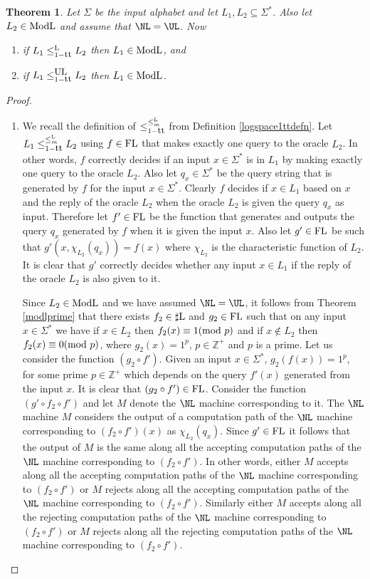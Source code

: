 \documentclass{amsbook}
\newtheorem{theorem}{Theorem}[chapter]
\theoremstyle{definition}
\theoremstyle{remark}
\numberwithin{section}{chapter}
\numberwithin{equation}{chapter}
\newcommand{\Lredn}{\leq^{\small{\rm L}}_m}
\newcommand{\ULredn}{\mbox{\small{\rm UL}}}
\newcommand{\sharpL}{\mbox{$\sharp$\rm L}}
\newcommand{\ModL}{\mbox{\rm ModL}}
\newcommand{\FL}{\mbox{\rm FL}}
\renewcommand{\mod}{\mbox{\textrm mod~}}
\newcommand{\Z}{\mathbb{Z}}
\newcommand{\trt}{\mbox{\small{\rm tt}}}
\begin{document}
\begin{theorem}\label{modlconclos}
Let $\Sigma$ be the input alphabet and let $L_1,L_2\subseteq \Sigma ^{*}$. Also let $L_2\in\ModL$ and assume that $\NL =\UL$. Now
\begin{enumerate}
\item \label{modl1trt} if $L_1\leq ^{\mathrm{L}}_{1-\trt}L_2$ then $L_1\in\ModL$, and 
\item \label{modlul1trt} if $L_1\leq^{\ULredn}_{1-\trt}L_2$ then $L_1\in\ModL$.
\end{enumerate}
\end{theorem}
\begin{proof}
\begin{enumerate}
\item We recall the definition of $\leq^{\Lredn}_{1-\trt}$ from Definition \ref{logspace1ttdefn}. Let $L_1\leq ^{\Lredn}_{1-\trt}L_2$ using $f\in\FL$ that makes exactly one query to the oracle $L_2$. In other words, $f$ correctly decides if an input $x\in\Sigma^{*}$ is in $L_1$ by making exactly one query to the oracle $L_2$. Also let  $q_x\in\Sigma ^{*}$ be the query string that is generated by $f$ for the input $x\in\Sigma ^{*}$. Clearly $f$ decides if $x\in L_1$ based on $x$ and the reply of the oracle $L_2$ when the oracle $L_2$ is given the query $q_x$ as input. Therefore let $f'\in\FL$ be the function that generates and outputs the query $q_x$ generated by $f$ when it is given the input $x$. Also let $g'\in\FL$ be such that $g'(x,\chi _{L_2}(q_x))=f(x)$ where $\chi _{L_2}$ is the characteristic function of $L_2$. It is clear that $g'$ correctly decides whether any input $x\in L_1$ if the reply of the oracle $L_2$ is also given to it.

Since $L_2\in\ModL$ and we have assumed $\NL =\UL$, it follows from Theorem \ref{modlprime} that there exists $f_2\in\sharpL$ and $g_2\in\FL$ such that on any input $x\in\Sigma^{*}$ we have if $x\in L_2$ then $f_2(x)\equiv 1(\mod p)$ and if $x\not \in L_2$ then $f_2(x)\equiv 0(\mod p)$, where $g_2(x)=1^p$, $p\in\Z^{+}$ and $p$ is a prime. Let us consider the function $(g_2\circ f')$. Given an input $x\in \Sigma^*$, $g_2(f(x))=1^p$, for some prime $p\in\Z^+$ which depends on the query $f'(x)$ generated from the input $x$. It is clear that $(g_2\circ f')\in\FL$. Consider the function $(g'\circ f_2\circ f')$ and let $M$ denote the $\NL$ machine corresponding to it. The $\NL$ machine $M$ considers the output of a computation path of the $\NL$ machine corresponding to $(f_2\circ f')(x)$ as $\chi _{L_2}(q_x)$. Since $g'\in\FL$ it follows that the output of $M$ is the same along all the accepting computation paths of the $\NL$ machine corresponding to $(f_2\circ f')$. In other words, either $M$ accepts along all the accepting computation paths of the $\NL$ machine corresponding to $(f_2\circ f')$ or $M$ rejects along all the accepting computation paths of the $\NL$ machine corresponding to $(f_2\circ f')$. Similarly either $M$ accepts along all the rejecting computation paths of the $\NL$ machine corresponding to $(f_2\circ f')$ or $M$ rejects along all the rejecting computation paths of the $\NL$ machine corresponding to $(f_2\circ f')$.


\end{enumerate}
\end{proof}
\end{document}
